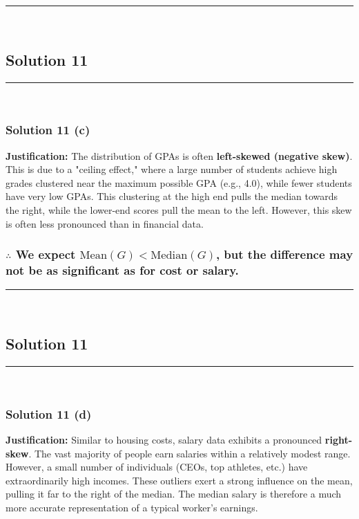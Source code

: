 \documentclass{article}
\begin{document}
\noindent\rule{\textwidth}{0.4pt}\\

\newpage


\subsection*{Solution 11}
\noindent\rule{\textwidth}{0.4pt}\\
\subsubsection*{Solution  11 (c)}

\parbox{\textwidth}{
    \textbf{Justification:} The distribution of GPAs is often \textbf{left-skewed (negative skew)}. This is due to a "ceiling effect," where a large number of students achieve high grades clustered near the maximum possible GPA (e.g., 4.0), while fewer students have very low GPAs. This clustering at the high end pulls the median towards the right, while the lower-end scores pull the mean to the left. However, this skew is often less pronounced than in financial data.
}

\subsubsection*{\normalfont $\therefore$ We expect $\text{Mean}(G) < \text{Median}(G)$, but the difference may not be as significant as for cost or salary.}

\noindent\rule{\textwidth}{0.4pt}\\

\newpage

\subsection*{Solution 11}
\noindent\rule{\textwidth}{0.4pt}\\
\subsubsection*{Solution  11 (d)}

\parbox{\textwidth}{
    \textbf{Justification:} Similar to housing costs, salary data exhibits a pronounced \textbf{right-skew}. The vast majority of people earn salaries within a relatively modest range. However, a small number of individuals (CEOs, top athletes, etc.) have extraordinarily high incomes. These outliers exert a strong influence on the mean, pulling it far to the right of the median. The median salary is therefore a much more accurate representation of a typical worker's earnings.
}
\vspace{1em}
\end{document}
